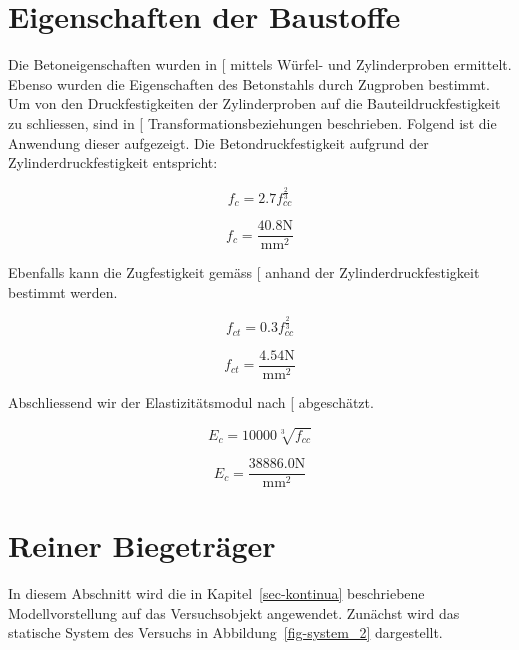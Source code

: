 \documentclass[
  12pt,
  letterpaper,
  egregdoesnotlikesansseriftitles]{scrreprt}
\begin{document}
\section{Eigenschaften der Baustoffe}\label{eigenschaften-der-baustoffe}

Die Betoneigenschaften wurden in {[}\citeproc{ref-Jaeger2006}{1}{]}
mittels Würfel- und Zylinderproben ermittelt. Ebenso wurden die
Eigenschaften des Betonstahls durch Zugproben bestimmt. Um von den
Druckfestigkeiten der Zylinderproben auf die Bauteildruckfestigkeit zu
schliessen, sind in {[}\citeproc{ref-Jaeger2014}{8}{]}
Transformationsbeziehungen beschrieben. Folgend ist die Anwendung dieser
aufgezeigt. Die Betondruckfestigkeit aufgrund der
Zylinderdruckfestigkeit entspricht:

\begin{equation}f_{c} = 2.7 f_{cc}^{\frac{2}{3}}\end{equation}

\begin{equation}f_{c} = \frac{40.8 \text{N}}{\text{mm}^{2}}\end{equation}

Ebenfalls kann die Zugfestigkeit gemäss
{[}\citeproc{ref-Jaeger2013}{9}{]} anhand der Zylinderdruckfestigkeit
bestimmt werden.

\begin{equation}f_{ct} = 0.3 f_{cc}^{\frac{2}{3}}\end{equation}

\begin{equation}f_{ct} = \frac{4.54 \text{N}}{\text{mm}^{2}}\end{equation}

Abschliessend wir der Elastizitätsmodul nach
{[}\citeproc{ref-Jaeger2013}{9}{]} abgeschätzt.

\begin{equation}E_{c} = 10000 \sqrt[3]{f_{cc}}\end{equation}

\begin{equation}E_{c} = \frac{38886.0 \text{N}}{\text{mm}^{2}}\end{equation}

\section{Reiner Biegeträger}\label{reiner-biegetruxe4ger}

In diesem Abschnitt wird die in Kapitel~\ref{sec-kontinua} beschriebene
Modellvorstellung auf das Versuchsobjekt angewendet. Zunächst wird das
statische System des Versuchs in Abbildung~\ref{fig-system_2}
dargestellt.
\end{document}
